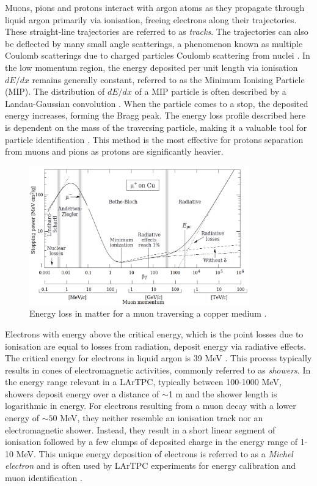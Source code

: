 Muons, pions and protons interact with argon atoms as they propagate through liquid argon primarily via ionisation, freeing electrons along their trajectories.
These straight-line trajectories are referred to as \textit{tracks}.
The trajectories can also be deflected by many small angle scatterings, a phenomenon known as multiple Coulomb scatterings due to charged particles Coulomb scattering from nuclei \cite{Passage}. 
In the low momentum region, the energy deposited per unit length via ionisation $dE/dx$ remains generally constant, referred to as the Minimum Ionising Particle (MIP).
The distribution of $dE/dx$ of a MIP particle is often described by a Landau-Gaussian convolution \cite{Passage}. 
When the particle comes to a stop, the deposited energy increases, forming the Bragg peak.
The energy loss profile described here is dependent on the mass of the traversing particle, making it a valuable tool for particle identification \cite{argoneut}.
This method is the most effective for protons separation from muons and pions as protons are significantly heavier.

\begin{figure}[ht!] 
\centering    
\includegraphics[width=0.85\textwidth]{BetheBloch}
\caption[Muon Energy Loss in a Copper Medium]{
Energy loss in matter for a muon traversing a copper medium \cite{Passage}.
}
\label{fig:BetheBloch}
\end{figure}

Electrons with energy above the critical energy, which is the point losses due to ionisation are equal to losses from radiation, deposit energy via radiative effects.
The critical energy for electrons in liquid argon is 39 MeV \cite{uboone_gamma}.
This process typically results in cones of electromagnetic activities, commonly referred to as \textit{showers}.
In the energy range relevant in a LArTPC, typically between 100-1000 MeV, showers deposit energy over a distance of $\sim$1 m and the shower length is logarithmic in energy.
For electrons resulting from a muon decay with a lower energy of $\sim50$ MeV, they neither resemble an ionisation track nor an electromagnetic shower.
Instead, they result in a short linear segment of ionisation followed by a few clumps of deposited charge in the energy range of 1-10 MeV.
This unique energy deposition of electrons is referred to as a \textit{Michel electron} and is often used by LArTPC experiments for energy calibration and muon identification \cite{uboone_michel}.

